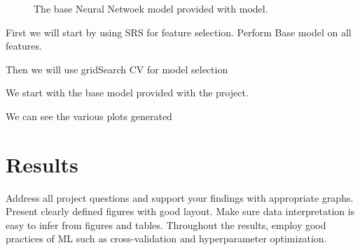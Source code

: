 \documentclass[]{article}
\begin{document}
\begin{figure}[ht]
	\caption{The base Neural Netwoek model provided  with  model.}
	\label{fig:base_model_plots}
\end{figure}


First we will start by using SRS for feature selection. Perform Base model on all features.


Then we will use gridSearch CV for model selection

We start with the base model provided with the project.

We can see the various plots generated



\clearpage
\section{Results}

Address all project questions and support your findings with appropriate graphs. Present
clearly defined figures with good layout. Make sure data interpretation is easy to infer
from figures and tables. Throughout the results, employ good practices of ML such as
cross-validation and hyperparameter optimization.
\end{document}
